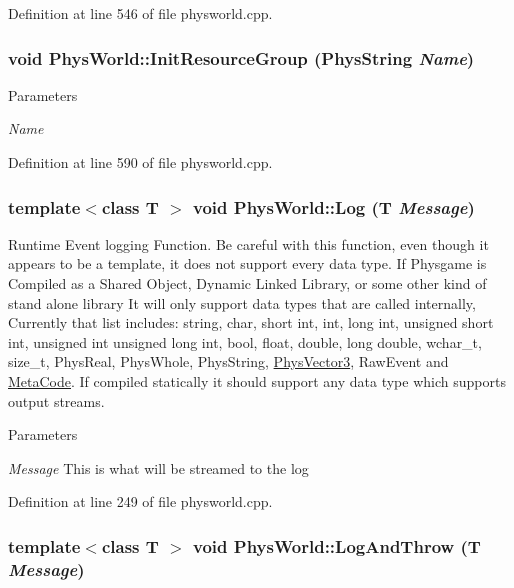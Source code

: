 Definition at line 546 of file physworld.cpp.\hypertarget{classPhysWorld_a0b67df4c76c32b9b2bdcafdc51f6aba7}{
\subsubsection[{InitResourceGroup}]{\setlength{\rightskip}{0pt plus 5cm}void PhysWorld::InitResourceGroup (PhysString {\em Name})}}
\label{db/df5/classPhysWorld_a0b67df4c76c32b9b2bdcafdc51f6aba7}

\begin{DoxyParams}{Parameters}
\item[{\em Name}]\end{DoxyParams}


Definition at line 590 of file physworld.cpp.\hypertarget{classPhysWorld_a5e9fead1c3100f5dbd5ca985b82b85ea}{
\subsubsection[{Log}]{\setlength{\rightskip}{0pt plus 5cm}template$<$class T $>$ void PhysWorld::Log (T {\em Message})}}
\label{db/df5/classPhysWorld_a5e9fead1c3100f5dbd5ca985b82b85ea}


Runtime Event logging Function. Be careful with this function, even though it appears to be a template, it does not support every data type. If Physgame is Compiled as a Shared Object, Dynamic Linked Library, or some other kind of stand alone library It will only support data types that are called internally, Currently that list includes: string, char, short int, int, long int, unsigned short int, unsigned int unsigned long int, bool, float, double, long double, wchar\_\-t, size\_\-t, PhysReal, PhysWhole, PhysString, \hyperlink{classPhysVector3}{PhysVector3}, RawEvent and \hyperlink{classMetaCode}{MetaCode}. If compiled statically it should support any data type which supports output streams. 
\begin{DoxyParams}{Parameters}
\item[{\em Message}]This is what will be streamed to the log \end{DoxyParams}


Definition at line 249 of file physworld.cpp.\hypertarget{classPhysWorld_a1c2aeaed2a89821a4545db854da33ab8}{
\subsubsection[{LogAndThrow}]{\setlength{\rightskip}{0pt plus 5cm}template$<$class T $>$ void PhysWorld::LogAndThrow (T {\em Message})}}
\label{db/df5/classPhysWorld_a1c2aeaed2a89821a4545db854da33ab8}


